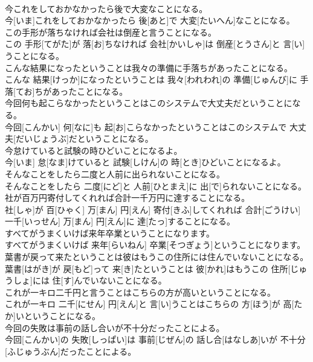 \documentclass[8pt]{extreport}
\begin{document}
\begin{CJK}{UTF8}{min}
\\	今これをしておかなかったら後で大変なことになる。	
\\	今[いま]これをしておかなかったら 後[あと]で 大変[たいへん]なことになる。
\\	この手形が落ちなければ会社は倒産と言うことになる。	
\\	この 手形[てがた]が 落[お]ちなければ 会社[かいしゃ]は 倒産[とうさん]と 言[い]うことになる。
\\	こんな結果になったということは我々の準備に手落ちがあったことになる。	
\\	こんな 結果[けっか]になったということは 我々[われわれ]の 準備[じゅんび]に 手落[てお]ちがあったことになる。
\\	今回何も起こらなかったということはこのシステムで大丈夫だということになる。	
\\	今回[こんかい] 何[なに]も 起[お]こらなかったということはこのシステムで 大丈夫[だいじょうぶ]だということになる。
\\	今怠けていると試験の時ひどいことになるよ。	
\\	今[いま] 怠[なま]けていると 試験[しけん]の 時[とき]ひどいことになるよ。
\\	そんなことをしたら二度と人前に出られないことになる。	
\\	そんなことをしたら 二度[にど]と 人前[ひとまえ]に 出[で]られないことになる。
\\	社が百万円寄付してくれれば合計一千万円に達することになる。	
\\	社[しゃ]が 百[ひゃく] 万[まん] 円[えん] 寄付[きふ]してくれれば 合計[ごうけい] 一千[いっせん] 万[まん] 円[えん]に 達[たっ]することになる。
\\	すべてがうまくいけば来年卒業ということになります。	
\\	すべてがうまくいけば 来年[らいねん] 卒業[そつぎょう]ということになります。
\\	葉書が戻って来たということは彼はもうこの住所には住んでいないことになる。	
\\	葉書[はがき]が 戻[もど]って 来[き]たということは 彼[かれ]はもうこの 住所[じゅうしょ]には 住[す]んでいないことになる。
\\	これが一キロ二千円と言うことはこちらの方が高いということになる。	
\\	これが一キロ 二千[にせん] 円[えん]と 言[い]うことはこちらの 方[ほう]が 高[たか]いということになる。
\\	今回の失敗は事前の話し合いが不十分だったことによる。	
\\	今回[こんかい]の 失敗[しっぱい]は 事前[じぜん]の 話し合[はなしあ]いが 不十分[ふじゅうぶん]だったことによる。

\end{CJK}
\end{document}
